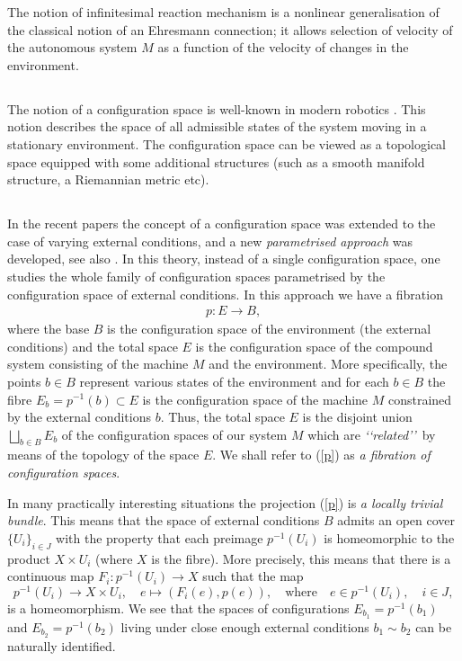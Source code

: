 \documentclass[11pt]{amsart}
\begin{document}
The notion of infinitesimal reaction mechanism is a nonlinear generalisation of the classical notion of an Ehresmann connection; it allows selection of velocity of the autonomous system $M$ as a function of the velocity of changes in the environment. 

%
\subsection{} The notion of a configuration space is well-known in modern robotics \cite{LP}. This notion describes the space of all admissible states of the system moving in a stationary environment. The configuration space can be viewed as a topological space equipped with some additional structures (such as a smooth manifold structure, a Riemannian metric etc). 

\subsection{}\label{sec:13} In the recent papers \cite{CFW21, CFW22} the concept of a configuration space was extended to the case of varying external conditions, and a new {\it parametrised approach} was developed, see also \cite{FW23}. In this theory, instead of a single configuration space, one studies the whole family of configuration spaces parametrised by the configuration space of external conditions. In this approach we have a fibration 
\begin{eqnarray}\label{p}
p: E\to B,
\end{eqnarray}
where the base $B$ is the configuration space of the environment (the external conditions) and the total space $E$ is the configuration space of the compound system consisting of the machine $M$ and the environment. More specifically, the points $b\in B$ represent various states of the environment and for each 
$b\in B$ the fibre $E_b= p^{-1}(b)\subset E$ is the configuration space of the machine $M$ constrained by the external conditions $b$. Thus, the total space $E$ 
is the disjoint union $\bigsqcup_{b\in B}E_b$ of the configuration spaces of our system $M$ which are {\it \lq\lq related\rq\rq}\ by means of the topology of the space $E$. We shall refer to (\ref{p}) as {\it a fibration of configuration spaces}. 

In many practically interesting situations the projection (\ref{p}) is {\it a locally trivial bundle}. This means that the  
space of external conditions $B$ admits an open cover $\{U_i\}_{i\in J}$ with the property that each 
preimage $p^{-1}(U_i)$ is homeomorphic to the product $X\times U_i$ (where $X$ is the fibre). More precisely, this means that there is a continuous map $F_i: p^{-1}(U_i)\to X$ such that the map 
$$p^{-1}(U_i)\to X\times U_i, \quad e\mapsto (F_i(e), p(e)),\quad \mbox{where}\quad e\in p^{-1}(U_i), \quad i\in J,$$
is a homeomorphism. We see that the spaces of configurations $E_{b_1}=p^{-1}(b_1)$ and $E_{b_2}=p^{-1}(b_2)$ living under close enough external conditions $b_1\sim b_2$ can be naturally identified. 
\end{document}
